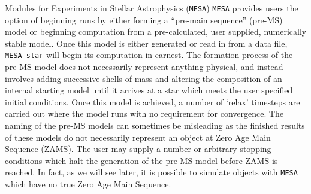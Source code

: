 \documentclass[a4paper,11pt]{article}
\begin{document}
\begin{section}{Modules for Experiments in Stellar Astrophysics (\texttt{MESA})}
    \texttt{MESA} provides users the option of beginning runs by either forming a ``pre-main sequence'' (pre-MS) model or beginning computation from a pre-calculated, user supplied, numerically stable model.
    Once this model is either generated or read in from a data file, \texttt{MESA star} will begin its computation in earnest.
    The formation process of the pre-MS model does not necessarily represent anything physical, and instead involves adding successive shells of mass and altering the composition of an internal starting model until it arrives at a star which meets the user specified initial conditions.
    Once this model is achieved, a number of `relax' timesteps are carried out where the model runs with no requirement for convergence.
    The naming of the pre-MS models can sometimes be misleading as the finished results of these models do not necessarily represent an object at Zero Age Main Sequence (ZAMS). The user may supply a number or arbitrary stopping conditions which halt the generation of the pre-MS model before ZAMS is reached.
    In fact, as we will see later, it is possible to simulate objects with \texttt{MESA} which have no true Zero Age Main Sequence. 

\end{section}
\end{document}
